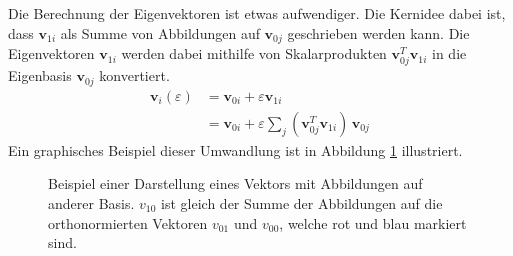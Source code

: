 Die Berechnung der Eigenvektoren ist etwas aufwendiger.
Die Kernidee dabei ist, dass $\bm v_{1i}$ als Summe von Abbildungen auf $\bm v_{0j}$ geschrieben werden kann.
Die Eigenvektoren $\bm v_{1i}$ werden dabei mithilfe von Skalarprodukten $\bm v_{0j}^T \bm v_{1i}$ in die Eigenbasis $\bm v_{0j}$ konvertiert.
\begin{align}
    \bm v_i(\varepsilon)
    &=
    \bm v_{0i} + \varepsilon \bm v_{1i} \\
    &=
    \bm v_{0i} + \varepsilon \sum_{j} \left( \bm v_{0j}^T \bm v_{1i} \right) \, \bm v_{0j}
\end{align}
Ein graphisches Beispiel dieser Umwandlung ist in Abbildung \ref{ew:fig:scalar_prod} illustriert.
\begin{figure}
    \begin{center}
        
    \end{center}
    \caption[Eigenräume]{
        Beispiel einer Darstellung eines Vektors mit Abbildungen auf anderer Basis.
        $v_{10}$ ist gleich der Summe der Abbildungen auf die orthonormierten Vektoren $v_{01}$ und $v_{00}$, welche rot und blau markiert sind.
    } \label{ew:fig:scalar_prod}
\end{figure}


